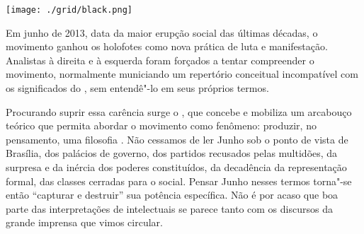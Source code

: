 \vfill

\hspace*{-.4cm}\begin{minipage}[c]{.5\linewidth}
\small{
{}}
\end{minipage}

\pagebreak

\begin{center}
\hspace*{.5cm}\texttt{[image: ./grid/black.png]}
\end{center}

\hspace*{-7cm}\hrulefill\hspace*{-7cm}

\medskip

\noindent{}Em junho de 2013, data da maior erupção social das últimas décadas, o movimento {} ganhou os holofotes como nova prática de luta e manifestação. Analistas à direita e à esquerda foram forçados a tentar compreender o movimento, normalmente municiando um repertório conceitual incompatível com os significados do {}, sem entendê"-lo em seus próprios termos.

Procurando suprir essa carência surge o {}, que concebe e mobiliza um arcabouço teórico que permita abordar o movimento {} como fenômeno: produzir, no pensamento, uma filosofia {}. Não cessamos de ler Junho sob o ponto de vista de Brasília, dos palácios de governo, dos partidos recusados pelas multidões, da surpresa e da inércia dos poderes constituídos, da decadência da representação formal, das classes cerradas para o social. Pensar Junho nesses termos torna"-se então “capturar e destruir” sua potência específica. Não é por acaso que boa parte das interpretações de intelectuais se parece tanto com os discursos da grande imprensa que vimos circular.


